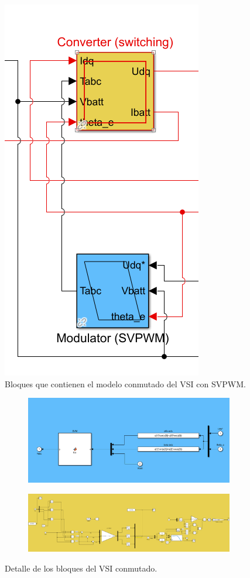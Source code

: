 \begin{figure}[H]
    \centering
    \includegraphics[width=0.25\linewidth]{fig/EMR_VSIsw_out.png}
    \caption{Bloques que contienen el modelo conmutado del VSI con SVPWM.}
    
\end{figure}

\begin{figure}[H]
    \centering

    \begin{subfigure}{0.75\linewidth}
        \centering
        \includegraphics[width=\linewidth]{fig/EMR_VSIsw_in1.png}   
    \end{subfigure}
    \begin{subfigure}{0.75\linewidth}
        \centering
        \includegraphics[width=\linewidth]{fig/EMR_VSIsw_in2.png}
    \end{subfigure}
    \caption{Detalle de los bloques del VSI conmutado.}

\end{figure}

